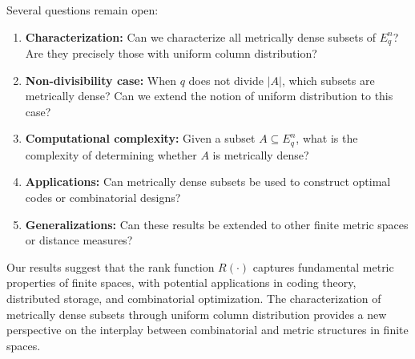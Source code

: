 \documentclass[12pt]{article}
\newcommand{\Eqn}{E_q^n}
\begin{document}
Several questions remain open:

\begin{enumerate}
\item \textbf{Characterization:} Can we characterize all metrically dense subsets of $\Eqn$? Are they precisely those with uniform column distribution?

\item \textbf{Non-divisibility case:} When $q$ does not divide $|A|$, which subsets are metrically dense? Can we extend the notion of uniform distribution to this case?

\item \textbf{Computational complexity:} Given a subset $A \subseteq \Eqn$, what is the complexity of determining whether $A$ is metrically dense?

\item \textbf{Applications:} Can metrically dense subsets be used to construct optimal codes or combinatorial designs?

\item \textbf{Generalizations:} Can these results be extended to other finite metric spaces or distance measures?
\end{enumerate}

Our results suggest that the rank function $R(\cdot)$ captures fundamental metric properties of finite spaces, with potential applications in coding theory, distributed storage, and combinatorial optimization. The characterization of metrically dense subsets through uniform column distribution provides a new perspective on the interplay between combinatorial and metric structures in finite spaces.
\end{document}
